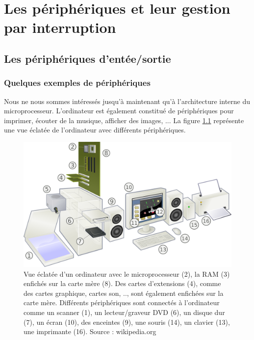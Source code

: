 \chapter{Les périphériques et leur gestion par interruption}
\label{chap:interrupions}

\section{Les périphériques d'entée/sortie}


\subsection{Quelques exemples de périphériques}

Nous ne nous sommes intéressés jusqu'à maintenant qu'à l'architecture interne du microprocesseur. L'ordinateur est également constitué de périphériques pour imprimer, écouter de la musique, afficher des images, ... La figure \ref{fig:peripherique} représente une vue éclatée de l'ordinateur avec différents périphériques.

\begin{figure}[htbp]
\includegraphics[width=\linewidth]{Figs/peripherique.pdf}
\caption{\label{fig:peripherique}Vue éclatée d'un ordinateur avec le microprocesseur (2), la RAM (3) enfichés sur la carte mère (8). Des cartes d'extensions (4), comme des cartes graphique, cartes son, .., sont également enfichées sur la carte mère. Différents périphériques sont connectés à l'ordinateur comme un scanner (1), un lecteur/graveur DVD (6), un disque dur (7), un écran (10), des enceintes (9), une souris (14), un clavier (13), une imprimante (16). Source : wikipedia.org}
\end{figure}


